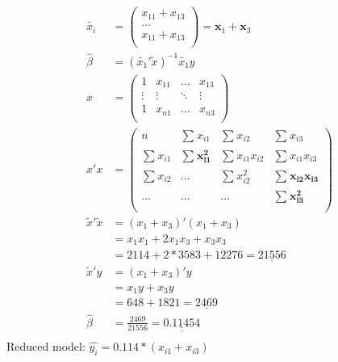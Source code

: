 \documentclass[]{article}
\begin{document}
\[
\begin{aligned}
\tilde{x_i} &= 
\begin{pmatrix}
x_{11} + x_{13}\\
\dots \\
x_{11} + x_{13}\\
\end{pmatrix}
=
\mathbf{x}_1 + \mathbf{x}_3\\[20pt]
\hat{\beta} &= (\tilde{x_1}' \tilde{x})^{-1} \tilde{x_1} y\\[20pt]
x &=
\begin{pmatrix}
1      & x_{11} & \dots  & x_{13} \\
\vdots & \vdots & \ddots & \vdots \\
1      & x_{n1} & \dots  & x_{n3}\\
\end{pmatrix}\\[20pt]
x'x &= 
\begin{pmatrix}
n                 & \sum_{}^{} x_{i1}            & \sum_{}^{} x_{i2}        & \sum_{}^{} x_{i3} \\
\sum_{}^{} x_{i1} & \mathbf{\sum_{}^{} x_{i1}^2} & \sum_{}^{} x_{i1} x_{i2} & \sum_{}^{} x_{i1} x_{i3} \\
\sum_{}^{} x_{i2} & \dots                        & \sum_{}^{} x_{i2}^2      & \mathbf{\sum_{}^{} x_{i2} x_{i3}} \\
\dots             & \dots                        & \dots                    & \mathbf{\sum_{}^{} x_{i3}^2} \\
\end{pmatrix}\\[20pt]
\tilde{x}'\tilde{x} &= (x_1 + x_3)'(x_1+x_3) \\
&= x_1 x_1 + 2 x_1 x_3 + x_3 x_3 \\
&= 2114 + 2 * 3583 + 12276 = \underline{21556} \\[20pt]
\tilde{x}'y &= (x_1+x_3)'y \\
&= x_1 y + x_3 y  \\
&= 648 + 1821 = \underline{2469} \\[20pt]
\hat{\beta} &= \frac{2469}{21556} = \underline{\underline{0.11454}} \\[20pt]
\end{aligned}
\] Reduced model: \(\hat{y_i} = 0.114*(x_{i1}+x_{i3})\)
\end{document}
